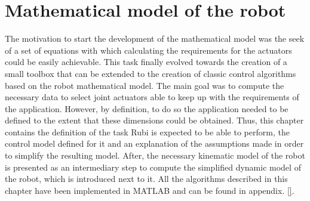 \chapter{Mathematical model of the robot} %
\label{cha:mathematical_model}

The motivation to start the development of the mathematical model was the seek of a set of equations with which calculating the requirements for the actuators could be easily achievable.
This task finally evolved towards the creation of a small toolbox that can be extended to the creation of classic control algorithms based on the robot mathematical model.
The main goal was to compute the necessary data to select joint actuators able to keep up with the requirements of the application.
However, by definition, to do so the application needed to be defined to the extent that these dimensions could be obtained.
Thus, this chapter contains the definition of the task Rubi is expected to be able to perform, the control model defined for it and an explanation of the assumptions made in order to simplify the resulting model. 
After, the necessary kinematic model of the robot is presented as an intermediary step to compute the simplified dynamic model of the robot, which is introduced next to it.
All the algorithms described in this chapter have been implemented in MATLAB and can be found in appendix. \ref{}.








